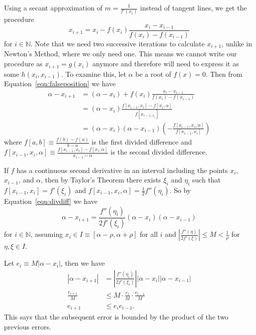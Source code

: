 \documentclass[12pt,letterpaper,DIV=11]{scrartcl}
\theoremstyle{plain}
\theoremstyle{definition}
\theoremstyle{remark}
\begin{document}
Using a secant approximation of $m = \frac{1}{f'(x_i)}$ instead of tangent lines,
we get the procedure \begin{equation}\label{eqn:falseposition}
  x_{i + 1} = x_i - f(x_i) \frac{x_i - x_{i - 1}}{f(x_i) - f(x_{i - 1})}
\end{equation} for $i \in \mathbb{N}$.
Note that we need two successive iterations to calculate $x_{i + 1}$, unlike in Newton's Method, where we only need one.
This means we cannot write our procedure as $x_{i + 1} = g(x_i)$ anymore and therefore will need to express it as some $h(x_i, x_{i - 1})$.
To examine this, let $\alpha$ be a root of $f(x) = 0$.
Then from Equation~\ref{eqn:falseposition} we have \begin{equation}
  \begin{split}\label{eqn:divdiff}
    \alpha - x_{i + 1} &= \left( \alpha - x_i \right) + f(x_i) \frac{x_i - x_{i - 1}}{f(x_i) - f(x_{i - 1})} \\
                       &= \left( \alpha - x_i \right) \frac{f[x_{i - 1}, x_i] - f[x_i, \alpha]}{f[x_{i - 1, x_i}]} \\
                       &= (\alpha - x_i) (\alpha - x_{i - 1}) \left( - \frac{f[x_{i - 1}, x_i, \alpha]}{f[x_{i - 1}, x_i]} \right)
  \end{split}
\end{equation}
where $f[a, b] \equiv \frac{f(b) - f(a)}{b - a}$ is the first divided difference and $f[x_{i - 1}, x_i, \alpha] \equiv \frac{f[x_{i - 1}, x_i] - f[x_i, \alpha]}{x_{i - 1} - \alpha}$ is the second divided difference.

If $f$ has a continuous second derivative in an interval including the points $x_i$, $x_{i - 1}$, and $\alpha$, then by Taylor's Theorem there exists $\xi_i$ and $\eta_i$  such that $f[x_{i - 1}, x_i] = f'(\xi_i)$ and $f[x_{i - 1}, x_i, \alpha] = \frac{1}{2} f''(\eta_i)$.
So by Equation~\ref{eqn:divdiff} we have \begin{displaymath}
  \alpha - x_{i + 1} = \frac{f''(\eta_i)}{2 f'(\xi_i)} (\alpha - x_i) (\alpha - x_{i - 1})
\end{displaymath} for $i \in \mathbb{N}$,
assuming $x_i \in I \equiv [\alpha - \rho, \alpha + \rho]$ for all $i$ and
$\left\lvert \frac{f''(\eta)}{2 f'(\xi)} \right\rvert \leq M < \frac{1}{\rho}$ for $\eta, \xi \in I$.

Let $e_i \equiv M |\alpha - x_i|$, then we have \begin{align*}
  | \alpha - x_{i + 1} | &= \left\lvert \frac{f''(\eta_i)}{2 f'(\xi_i)} \right\rvert \left\lvert \alpha - x_i \right\rvert \left\lvert \alpha - x_{i - 1} \right\rvert \\
  \frac{e_{i + 1}}{M} &\leq M \cdot \frac{e_i}{M} \cdot \frac{e_{i - 1}}{M} \\
  e_{i + 1} &\leq e_i e_{i - 1}.
\end{align*}
This says that the subsequent error is bounded by the product of the two previous errors.
\end{document}
